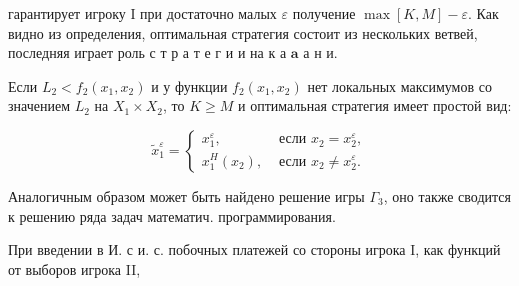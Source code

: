 \documentclass[10pt]{article}
\begin{document}
гарантирует игроку I при достаточно малых $\varepsilon$ получение $\max [K, M]-\varepsilon$. Как видно из определения, оптимальная стратегия состоит из нескольких ветвей, последняя играет роль с т р а т е г и и на к а $\mathbf{a}$ а н и.



Если $L_{2}<f_{2}\left(x_{1}, x_{2}\right)$ и у функции $f_{2}\left(x_{1}, x_{2}\right)$ нет локальных максимумов со значением $L_{2}$ на $X_{1} \times X_{2}$, то $K \geqslant M$ и оптимальная стратегия имеет простой вид:



\[

\tilde{x}_{1}^{\varepsilon}= \begin{cases}x_{1}^{\varepsilon}, & \text { если } x_{2}=x_{2}^{\varepsilon}, \\ x_{1}^{H}\left(x_{2}\right), & \text { если } x_{2} \neq x_{2}^{\varepsilon} .\end{cases}

\]



Аналогичным образом может быть найдено решение игры $\Gamma_{3}$, оно также сводится к решению ряда задач математич. программирования.



При введении в И. с и. с. побочных платежей со стороны игрока I, как функций от выборов игрока II,
\end{document}
